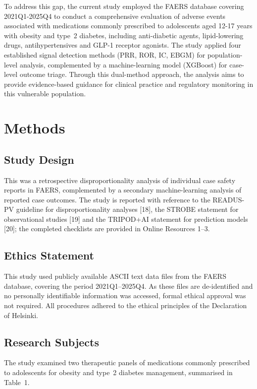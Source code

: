 \documentclass[10pt,a4paper]{article}
\begin{document}
To address this gap, the current study employed the FAERS database covering 2021Q1-2025Q4 to conduct a comprehensive evaluation of adverse events associated with medications commonly prescribed to adolescents aged 12-17 years with obesity and type~2 diabetes, including anti-diabetic agents, lipid-lowering drugs, antihypertensives and GLP-1 receptor agonists. The study applied four established signal detection methods (PRR, ROR, IC, EBGM) for population-level analysis, complemented by a machine-learning model (XGBoost) for case-level outcome triage. Through this dual-method approach, the analysis aims to provide evidence-based guidance for clinical practice and regulatory monitoring in this vulnerable population.

\section{Methods}

\subsection{Study Design}
This was a retrospective disproportionality analysis of individual case safety reports in FAERS, complemented by a secondary machine-learning analysis of reported case outcomes. The study is reported with reference to the READUS-PV guideline for disproportionality analyses [18], the STROBE statement for observational studies [19] and the TRIPOD+AI statement for prediction models [20]; the completed checklists are provided in Online Resources 1--3.

\subsection{Ethics Statement}
This study used publicly available ASCII text data files from the FAERS database, covering the period 2021Q1--2025Q4. As these files are de-identified and no personally identifiable information was accessed, formal ethical approval was not required. All procedures adhered to the ethical principles of the Declaration of Helsinki.

\subsection{Research Subjects}
The study examined two therapeutic panels of medications commonly prescribed to adolescents for obesity and type~2 diabetes management, summarised in Table~1.
\end{document}
